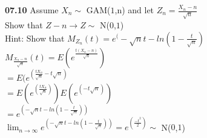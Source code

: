 
{ \bf 07.10 }
Assume $X_{n}\sim$ GAM($1$,n) and let $Z_{n} = \frac{X_{n} - n}{\sqrt{n}}$\\
Show that $Z-{n} \rightarrow Z\sim$ N($0$,$1$)\\
Hint: Show that $M_{Z_{n}}(t) = e^(-\sqrt{n}t - ln(1-\frac{t}{\sqrt{n}})$\\

$M_{\frac{X_{n}-n}{\sqrt{n}}}(t) = E(e^\frac{t(X_{n}-n)}{\sqrt{n}})$\\
    $=E(e^(\frac{tX_{n}}{\sqrt{n}}-t\sqrt{n})$\\
    $=E(e^(\frac{tX_{n}}{\sqrt{n}}))E(e^(-t\sqrt{n}))$\\
    $=e^(-\sqrt{n}t - ln(1-\frac{t}{\sqrt{n}}))$\\
    $\lim_{n\to\infty} e^(-\sqrt{n}t - ln(1-\frac{t}{\sqrt{n}})) = e^(\frac{-t^2}{2})\sim$ N($0$,$1$)\\ 
